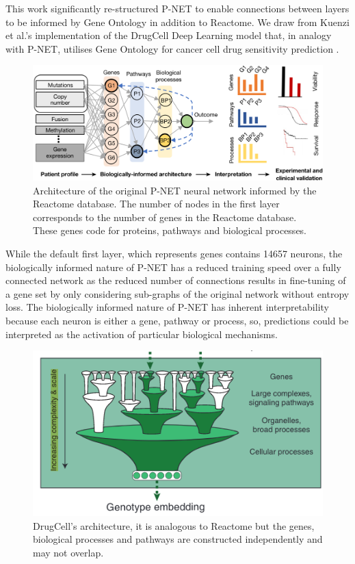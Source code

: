 \documentclass[NOTE, disdraft=true, UKenglish]{\DISCDTLATEXPATH UCLCDTDISdoc}
\begin{document}
This work significantly re-structured P-NET to enable connections between layers to be informed by Gene Ontology in addition to Reactome. We draw from Kuenzi et al.'s implementation of the DrugCell Deep Learning model that, in analogy with P-NET, utilises Gene Ontology for cancer cell drug sensitivity prediction \cite{kuenzi_predicting_2020}.

\begin{figure}
    \centering
    \includegraphics[width=\linewidth]{Figures/pnet_architecture.png}
    \caption{Architecture of the original P-NET neural network \cite{elmarakeby_biologically_2021} informed by the Reactome database. The number of nodes in the first layer corresponds to the number of genes in the Reactome database. These genes code for proteins, pathways and biological processes.}
    \label{fig:ogpnet}
\end{figure}

While the default first layer, which represents genes contains 14657 neurons, the biologically informed nature of P-NET has a reduced training speed over a fully connected network as the reduced number of connections results in fine-tuning of a gene set by only considering sub-graphs of the original network without entropy loss. The biologically informed nature of P-NET has inherent interpretability because each neuron is either a gene, pathway or process, so, predictions could be interpreted as the activation of particular biological mechanisms.

\begin{figure}
    \centering
    \includegraphics[width=\linewidth]{Figures/drugcell_architecture.png}
    \caption{DrugCell's \cite{kuenzi_predicting_2020} architecture, it is analogous to Reactome but the genes, biological processes and pathways are constructed independently and may not overlap.}
    \label{fig:drugcell}
\end{figure}
\end{document}
